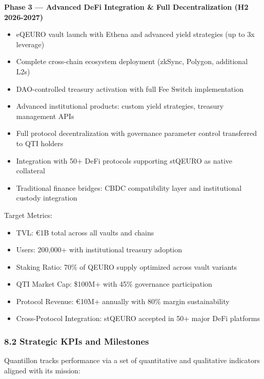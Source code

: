 \textbf{Phase 3 --- Advanced DeFi Integration \& Full Decentralization
(H2 2026-2027)}

\begin{itemize}
\item
  eQEURO vault launch with Ethena and advanced yield strategies (up to
  3x leverage)
\item
  Complete cross-chain ecosystem deployment (zkSync, Polygon, additional
  L2s)
\item
  DAO-controlled treasury activation with full Fee Switch implementation
\item
  Advanced institutional products: custom yield strategies, treasury
  management APIs
\item
  Full protocol decentralization with governance parameter control
  transferred to QTI holders
\item
  Integration with 50+ DeFi protocols supporting stQEURO as native
  collateral
\item
  Traditional finance bridges: CBDC compatibility layer and
  institutional custody integration
\end{itemize}

Target Metrics:

\begin{itemize}
\item
  TVL: €1B total across all vaults and chains
\item
  Users: 200,000+ with institutional treasury adoption
\item
  Staking Ratio: 70\% of QEURO supply optimized across vault variants
\item
  QTI Market Cap: \$100M+ with 45\% governance participation
\item
  Protocol Revenue: €10M+ annually with 80\% margin sustainability
\item
  Cross-Protocol Integration: stQEURO accepted in 50+ major DeFi
  platforms
\end{itemize}

\hypertarget{strategic-kpis-and-milestones}{%
\subsubsection{8.2 Strategic KPIs and
Milestones}\label{strategic-kpis-and-milestones}}

Quantillon tracks performance via a set of quantitative and qualitative
indicators aligned with its mission:

